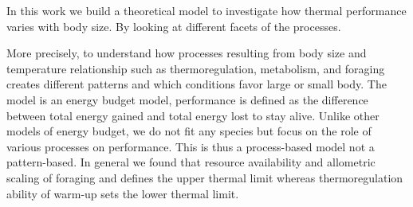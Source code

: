 
 In this work we build a theoretical model to investigate how thermal performance varies with body size.
 By looking at different facets of the processes.
 
 More precisely, to understand how processes resulting from body size and temperature relationship such as thermoregulation, metabolism, and foraging creates different patterns and which conditions favor large or small body.
 The model is an energy budget model, performance is defined as the difference between total energy gained and total energy lost to stay alive.
 Unlike other models of energy budget, we do not fit any species but focus on the role of various processes on performance. This is thus a process-based model not a pattern-based.
In general we found that resource availability and allometric scaling of foraging and defines the upper thermal limit whereas thermoregulation ability of warm-up sets the lower thermal limit.

